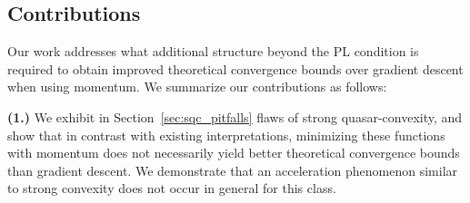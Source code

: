 \documentclass{article}
\newcommand{\jh}[1]{{\color{red} #1}}
\def\R{{\mathbb{R}}}
\newcommand{\bigO}{\mathcal{O}}
\theoremstyle{plain}
\theoremstyle{definition}
\theoremstyle{remark}
\begin{document}




\subsection{Contributions}
Our work addresses what additional structure beyond the PL condition is required to obtain improved theoretical convergence bounds over gradient descent when using momentum. We summarize our contributions as follows:

\noindent \textbf{(1.)} 
We exhibit in Section~\ref{sec:sqc_pitfalls} flaws of strong quasar-convexity, and show that in contrast with existing interpretations, minimizing these functions with momentum does not necessarily yield better theoretical convergence bounds than gradient descent. We demonstrate that an acceleration phenomenon similar to strong convexity does not occur in general for this class.
\end{document}
